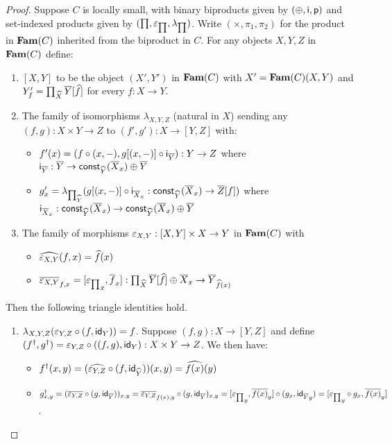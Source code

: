 \begin{proof}
Suppose $C$ is locally small, with binary biproducts given by $(\oplus,\mathsf{i},\mathsf{p})$ and set-indexed
products given by $(\prod,\varepsilon_{\prod},\lambda_{\prod})$. Write $(\times,\pi_1,\pi_2)$ for the product in
$\mathbf{Fam}(C)$ inherited from the biproduct in $C$. For any objects $X, Y, Z$ in $\mathbf{Fam}(C)$ define:

\begin{enumerate}
\item $[X, Y]$ to be the object $(X',Y')$ in $\mathbf{Fam}(C)$ with $X' = \mathbf{Fam}(C)(X,Y)$ and $Y'_f =
\prod_{\widehat{X}}\overline{Y}[\widehat{f}]$ for every $f: X \to Y$.
\item The family of isomorphisms $\lambda_{X,Y,Z}$ (natural in $X$) sending any $(f, g): X \times Y \to Z$ to
$(f', g'): X \to [Y, Z]$ with:
\begin{itemize}
\item $f'(x) = (f \circ (x, -), g[(x,-)] \circ \mathsf{i}_{\overline{Y}}):
Y \to Z$ where $\mathsf{i}_{\overline{Y}}: \overline{Y} \to \mathsf{const}_{\widehat{Y}}(\overline{X}_x) \oplus \overline{Y}$
\item $g'_x = \lambda_{\prod_{\widehat{Y}}}(g[(x,-)] \circ \mathsf{i}_{\overline{X}_x}:
\mathsf{const}_{\widehat{Y}}(\overline{X}_x) \to \overline{Z}[f])$ where $\mathsf{i}_{\overline{X}_x}: \mathsf{const}_{\widehat{Y}}(\overline{X}_x)
\to \mathsf{const}_{\widehat{Y}}(\overline{X}_x) \oplus \overline{Y}$
\end{itemize}
\item The family of morphisms $\varepsilon_{X,Y}: [X, Y] \times X \to Y$ in $\mathbf{Fam}(C)$ with
\begin{itemize}
\item $\widehat{\varepsilon_{X,Y}}(f, x) = \widehat{f}(x)$
\item $\overline{\varepsilon_{X,Y}}_{f, x} = [{\varepsilon_{\prod}}_x, \overline{f}_x]:
\prod_{\widehat{X}}\overline{Y}[\widehat{f}] \oplus \overline{X}_x \to \overline{Y}_{\widehat{f}(x)}$
\end{itemize}
\end{enumerate}

Then the following triangle identities hold.
\begin{enumerate}
\item $\lambda_{X,Y,Z}(\varepsilon_{Y,Z} \circ (f, \mathsf{id}_Y)) = f$. Suppose $(f,g): X \to [Y,Z]$ and define
$(f^\dagger, g^\dagger) = \varepsilon_{Y,Z} \circ ((f,g), \mathsf{id}_Y): X \times Y \to Z$. We then have:
\begin{itemize}
\item $f^\dagger(x,y) = (\widehat{\varepsilon_{Y,Z}} \circ (f, \mathsf{id}_{\widehat{Y}}))(x,y) = \widehat{f(x)}(y)$
\item $g^\dagger_{x,y} = (\overline{\varepsilon_{Y,Z}} \circ (g, \mathsf{id}_{\overline{Y}}))_{x,y} = \overline{\varepsilon_{Y,Z}}_{f(x), y}
\circ (g, \mathsf{id}_{\overline{Y}})_{x,y} = [{\varepsilon_{\prod}}_y, \overline{f(x)}_y] \circ (g_x, {\mathsf{id}_{\overline{Y}}}_y) =
[{\varepsilon_{\prod}}_y \circ g_x, \overline{f(x)}_y]$.
\end{itemize}


\end{enumerate}
\end{proof}
